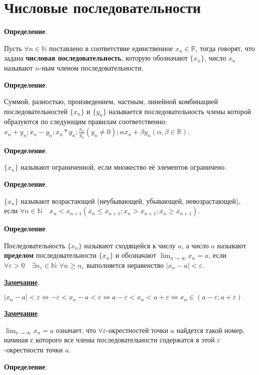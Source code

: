 \documentclass{article}
\begin{document}
\section{Числовые последовательности}

\textbf{Определение}.

Пусть $\forall n \in \mathbb{N}$ поставлено в соответствие единственное $x_n \in \mathbb{R}$,
тогда говорят, что задана \textbf{числовая последовательность}, которую обозначают
$\{x_n\}$, число $x_n$ называют $n$-ным членом последовательности.

\textbf{Определение}.

Суммой, разностью, произведением, частным, линейной комбинацией последовательностей 
$\{x_n\}$ и $\{y_n\}$ называется последовательность члены которой образуются 
по следующим правилам соответственно: 
$x_n + y_n; x_n - y_n; x_n * y_n; \frac{x_n}{y_n} (y_n \ne 0); \alpha x_n + \beta y_n (\alpha, \beta \in \mathbb{R})$.

\textbf{Определение}.

$\{x_n\}$ называют ограниченной, если множество её элементов ограничено.

\textbf{Определение}.

$\{x_n\}$ называют возрастающей (неубывающей, убывающей, невозрастающей), если
$\forall n \in \mathbb{N} \quad x_n < x_{n + 1} (x_n \le x_{n + 1}; x_n > x_{n + 1}; x_n \ge x_{n + 1})$.

\textbf{Определение}.

Последовательность $\{x_n\}$ называют сходящейся к числу $a$, а число $a$ называют
\textbf{пределом} последовательности $\{x_n\}$ и обозначают 
$\displaystyle\lim_{n \rightarrow \infty} x_n = a$, если 
$\forall \varepsilon > 0 \quad \exists n_\varepsilon \in \mathbb{N}: \forall n \ge n_\varepsilon$
выполняется неравенство $|x_n - a| < \varepsilon$.

\underline{\textbf{Замечание}}.

$|x_n - a| < \varepsilon \Leftrightarrow -\varepsilon < x_n - a < \varepsilon 
\Leftrightarrow a - \varepsilon < x_n < a + \varepsilon
\Leftrightarrow x_n \in (a - \varepsilon; a + \varepsilon)$

\underline{\textbf{Замечание}}.

$\displaystyle\lim_{x \rightarrow \infty} x_n = a$ означает, что
$\forall \varepsilon$-окрестностей точки $a$ найдется такой номер, 
начиная с которого все члены последовательности содержатся в этой
$\varepsilon$-окрестности точки $a$.

\textbf{Определение}.
\end{document}
